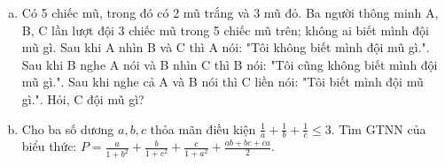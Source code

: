 \begin{ex} %
	\begin{enumerate}[a)]
		\item Có 5 chiếc mũ, trong đó có 2 mũ trắng và 3 mũ đỏ. Ba người thông minh A, B, C lần lượt đội 3 chiếc mũ trong 5 chiếc mũ trên; không ai biết mình đội mũ gì. Sau khi A nhìn B và C thì A nói: "Tôi không biết mình đội mũ gì.". Sau khi B nghe A nói và B nhìn C thì B nói: "Tôi cũng không biết mình đội mũ gì.". Sau khi nghe cả A và B nói thì C liền nói: "Tôi biết mình đội mũ gì.". Hỏi, C đội mũ gì?
		\item Cho ba số dương $a, b, c$ thỏa mãn điều kiện $\frac{1}{a} + \frac{1}{b} + \frac{1}{c} \le 3$.
		Tìm GTNN của biểu thức: $P = \frac{a}{1+b^2} + \frac{b}{1+c^2} + \frac{c}{1+a^2} + \frac{ab+bc+ca}{2}$.
	\end{enumerate}
	\loigiai{}
\end{ex}

